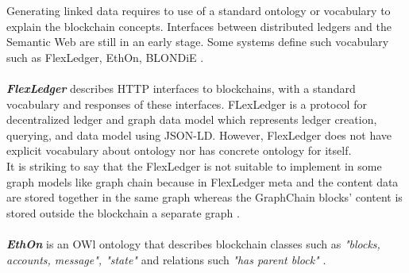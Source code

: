 Generating linked data requires to use of a standard ontology or vocabulary to explain the blockchain concepts. Interfaces between distributed ledgers and the Semantic Web are still in an early stage. Some systems define such vocabulary such as FlexLedger, EthOn, BLONDiE \cite{Third}.\\
\\
\textbf{\textit{FlexLedger}} describes HTTP interfaces to blockchains, with a standard vocabulary and responses of these interfaces. FLexLedger is a protocol for decentralized ledger and graph data model which represents ledger creation, querying, and data model using JSON-LD. However, FlexLedger does not have explicit vocabulary about ontology nor has concrete ontology for itself. \\
It is striking to say that the FlexLedger is not suitable to implement in some graph models like graph chain because in FlexLedger meta and the content data are stored together in the same graph whereas the GraphChain blocks’ content is stored outside the blockchain a separate graph \cite{Sopek}.\\
\\
\textbf{\textit{EthOn}} is an OWl ontology that describes blockchain classes such as \textit{"blocks, accounts, message", "state"} and relations such \textit{"has parent block"} \cite{Rashid}. 
